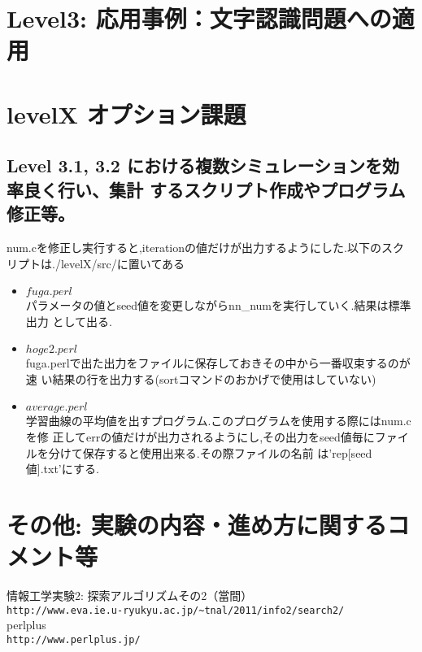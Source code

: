 \documentclass[10pt]{jarticle}
\begin{document}
\newpage

\section{Level3: 応用事例：文字認識問題への適用}





\newpage
\section{levelX オプション課題}
\subsection{Level 3.1, 3.2 における複数シミュレーションを効率良く行い、集計
 するスクリプト作成やプログラム修正等。}
num.cを修正し実行すると,iterationの値だけが出力するようにした.以下のスク
リプトは./levelX/src/に置いてある
\begin{itemize}
 \item $fuga.perl$ \\
パラメータの値とseed値を変更しながらnn\_numを実行していく.結果は標準出力
       として出る.
 \item $hoge2.perl$ \\
fuga.perlで出た出力をファイルに保存しておきその中から一番収束するのが速
       い結果の行を出力する(sortコマンドのおかげで使用はしていない)
 \item $average.perl$ \\
学習曲線の平均値を出すプログラム.このプログラムを使用する際にはnum.cを修
       正してerrの値だけが出力されるようにし,その出力をseed値毎にファイ
       ルを分けて保存すると使用出来る.その際ファイルの名前
       は'rep[seed値].txt'にする.
\end{itemize}
\section{その他: 実験の内容・進め方に関するコメント等}


\vspace{+1.0cm}
\begin{thebibliography}{99}
情報工学実験2: 探索アルゴリズムその2（當間）\\
\verb|http://www.eva.ie.u-ryukyu.ac.jp/~tnal/2011/info2/search2/|\\
perlplus\\
\verb|http://www.perlplus.jp/|
\end{thebibliography}
\end{document}
